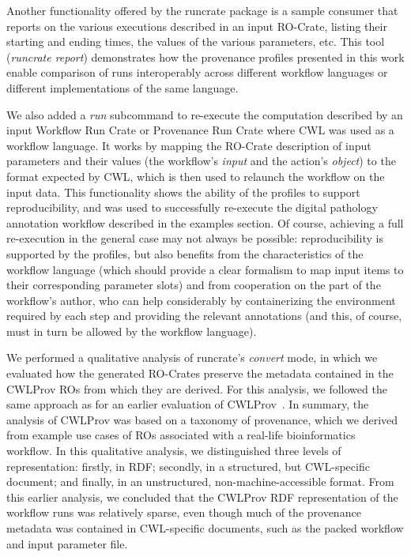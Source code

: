 \documentclass[10pt,letterpaper]{article}
\begin{document}
Another functionality offered by the runcrate package is a sample consumer that reports on the various executions described in an input RO-Crate, listing their starting and ending times, the values of the various parameters, etc.
This tool (\emph{runcrate report}) demonstrates how the provenance profiles presented in this work enable comparison of runs interoperably across different workflow languages or different implementations of the same language.

We also added a \emph{run} subcommand to re-execute the computation described by an input Workflow Run Crate or Provenance Run Crate where CWL was used as a workflow language.
It works by mapping the RO-Crate description of input parameters and their values (the workflow's
\emph{input} and the action's \emph{object}) to the format expected by CWL, which is then used to relaunch the workflow on the input data.
This functionality shows the ability of the profiles to support reproducibility, and was used to successfully re-execute the digital pathology annotation workflow described in the examples section.
Of course, achieving a full re-execution in the general case may not always be possible: reproducibility is supported by the profiles, but also benefits from the characteristics of the workflow language (which should provide a clear formalism to map input items to their corresponding parameter slots) and from cooperation on the part of the workflow's author, who can help considerably by containerizing the environment required by each step and providing the relevant annotations (and this, of course, must in turn be allowed by the workflow language).

We performed a qualitative analysis of runcrate's \emph{convert} mode, in which we evaluated how the generated RO-Crates preserve the metadata contained in the CWLProv ROs from which they are derived.
For this analysis, we followed the same approach as for an earlier evaluation of CWLProv~\cite{De Wit 2022}.
In summary, the analysis of CWLProv was based on a taxonomy of provenance, which we derived from example use cases of ROs associated with a real-life bioinformatics workflow.
In this qualitative analysis, we distinguished three levels of representation:
firstly, in RDF; secondly, in a structured, but CWL-specific document;
and finally, in an unstructured, non-machine-accessible format.
From this earlier analysis, we concluded that the CWLProv RDF representation of the workflow runs was relatively sparse, even though much of the provenance metadata was contained in CWL-specific documents, such as the packed workflow and input parameter file.
\end{document}
